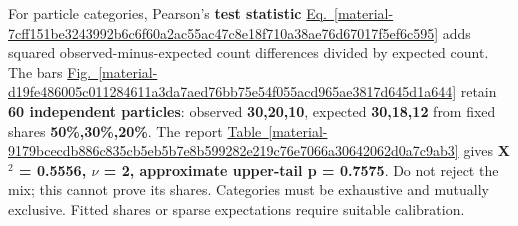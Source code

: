 \documentclass[11pt,a4paper]{article}
\begin{document}
For particle categories, Pearson's \textbf{test statistic} \hyperref[material-7cff151be3243992b6c6f60a2ac55ac47c8e18f710a38ae76d67017f5ef6c595]{Eq.~\ref*{material-7cff151be3243992b6c6f60a2ac55ac47c8e18f710a38ae76d67017f5ef6c595}} adds squared observed-minus-expected count differences divided by expected count. The bars \hyperref[material-d19fe486005c011284611a3da7aed76bb75e54f055acd965ae3817d645d1a644]{Fig.~\ref*{material-d19fe486005c011284611a3da7aed76bb75e54f055acd965ae3817d645d1a644}} retain \textbf{60 independent particles}: observed \textbf{30,20,10}, expected \textbf{30,18,12} from fixed shares \textbf{50\%,30\%,20\%}. The report \hyperref[material-9179bcecdb886c835cb5eb5b7e8b599282e219c76e7066a30642062d0a7c9ab3]{Table~\ref*{material-9179bcecdb886c835cb5eb5b7e8b599282e219c76e7066a30642062d0a7c9ab3}} gives \textbf{X\ensuremath{{}^2} = 0.5556, \ensuremath{\nu} = 2, approximate upper-tail p = 0.7575}. Do not reject the mix; this cannot prove its shares. Categories must be exhaustive and mutually exclusive. Fitted shares or sparse expectations require suitable calibration.
\end{document}

